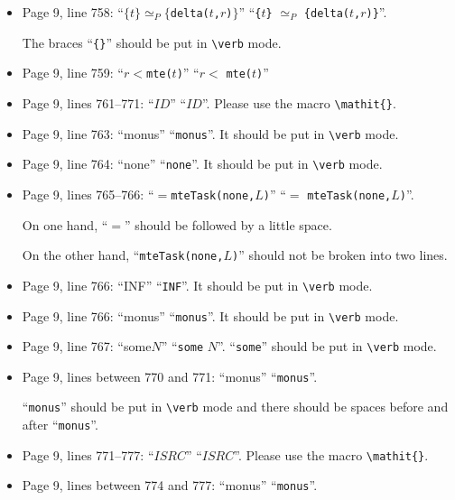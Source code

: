 \documentclass[12pt,onecolumn]{IEEEtranTIE}
\begin{document}
\begin{itemize}
\item Page 9, line 758: ``$\{t\} \simeq_P
  \{$\verb|delta(|$t$\verb|,|$r$\verb|)|$\}$'' \by
  ``\verb|{|$t$\verb|}| $\simeq_P$
  \verb|{delta(|$t$\verb|,|$r$\verb|)}|''. 

The braces ``\verb|{}|'' should be put in \verb|\verb| mode.

\item Page 9, line 759: ``$r<$\verb|mte(|$t$\verb|)|'' \by ``$r<$
  \verb|mte(|$t$\verb|)|''

\item Page 9, lines 761--771: ``$ID$'' \by ``$\mathit{ID}$''. Please
  use the macro \verb|\mathit{}|.

\item Page 9, line 763: ``monus'' \by ``\verb|monus|''. It should be
  put in \verb|\verb| mode.

\item Page 9, line 764: ``none'' \by ``\verb|none|''. It should be put
  in \verb|\verb| mode.

\item Page 9, lines 765--766: ``$=$\verb|mteTask(none,|$L$\verb|)|''
  \by ``$=$ \verb|mteTask(none,|$L$\verb|)|''. 

On one hand, ``$=$'' should be followed by a little space.

On the other hand, ``\verb|mteTask(none,|$L$\verb|)|'' should not be
broken into two lines.

\item Page 9, line 766: ``INF'' \by ``\verb|INF|''. It should be put
  in \verb|\verb| mode.

\item Page 9, line 766: ``monus'' \by ``\verb|monus|''. It should be
  put in \verb|\verb| mode.

\item Page 9, line 767: ``some$N$'' \by ``\verb|some|
  $N$''. ``\verb|some|'' should be put in \verb|\verb| mode.

\item Page 9, lines between 770 and 771: ``monus'' \by ``\verb|monus|''. 

``\verb|monus|'' should be put in \verb|\verb| mode and there should
  be spaces before and after ``\verb|monus|''.

\item Page 9, lines 771--777: ``$ISRC$'' \by
  ``$\mathit{ISRC}$''. Please use the macro \verb|\mathit{}|.

\item Page 9, lines between 774 and 777: ``monus'' \by ``\verb|monus|''. 


\end{itemize}
\end{document}
